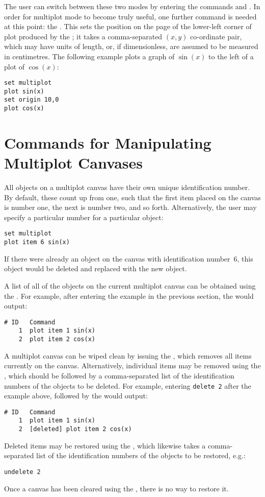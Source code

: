 The user can switch between these two modes by entering the commands
 and .  In order for
multiplot mode to become truly useful, one further command is needed at this
point: the .  This sets the position on the page of the
lower-left corner of plot produced by the ; it takes a
comma-separated $(x,y)$ co-ordinate pair, which may have units of length, or,
if dimensionless, are assumed to be measured in centimetres. The following
example plots a graph of $\sin(x)$ to the left of a plot of $\cos(x)$:
\begin{verbatim}
set multiplot
plot sin(x)
set origin 10,0
plot cos(x)
\end{verbatim}

\section{Commands for Manipulating Multiplot Canvases}

All objects on a multiplot canvas have their own unique identification number.
By default, these count up from one, such that the first item placed on the
canvas is number one, the next is number two, and so forth. Alternatively, the
user may specify a particular number for a particular object:
\begin{verbatim}
set multiplot
plot item 6 sin(x)
\end{verbatim}
If there were already an object on the canvas with identification number~6,
this object would be deleted and replaced with the new object.

A list of all of the objects on the current multiplot canvas can be obtained
using the . For example, after entering the example in the
previous section, the  would output:
\begin{verbatim}
# ID   Command
    1  plot item 1 sin(x)
    2  plot item 2 cos(x)
\end{verbatim}

A multiplot canvas can be wiped clean by issuing the , which
removes all items currently on the canvas. Alternatively, individual items may
be removed using the , which should be followed by a
comma-separated list of the identification numbers of the objects to be
deleted. For example, entering {\tt delete 2} after the example above, followed
by the  would output:
\begin{verbatim}
# ID   Command
    1  plot item 1 sin(x)
    2  [deleted] plot item 2 cos(x)
\end{verbatim}
Deleted items may be restored using the , which likewise
takes a comma-separated list of the identification numbers of the objects to be
restored, e.g.:
\begin{verbatim}
undelete 2
\end{verbatim}
Once a canvas has been cleared using the , there is no way to
restore it.

